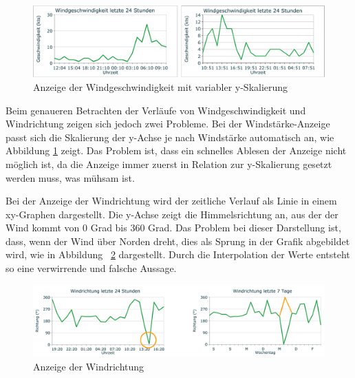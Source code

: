 \begin{figure}[h!]
	\centering
	\includegraphics[width=1\linewidth]{img/wind-geschw}
	\caption{Anzeige der Windgeschwindigkeit mit variabler y-Skalierung}
	\label{img:wind-geschw}
\end{figure}

\noindent
Beim genaueren Betrachten der Verläufe von Windgeschwindigkeit und Windrichtung zeigen sich jedoch zwei Probleme.
Bei der Windstärke-Anzeige passt sich die Skalierung der y-Achse je nach Windstärke automatisch an, wie Abbildung \ref{img:wind-geschw} zeigt. Das Problem ist, dass ein schnelles Ablesen der Anzeige nicht möglich ist, da die Anzeige immer zuerst in Relation zur y-Skalierung gesetzt werden muss, was mühsam ist.
\newline



\noindent
Bei der Anzeige der Windrichtung wird der zeitliche Verlauf als Linie in einem xy-Graphen dargestellt. Die y-Achse zeigt die Himmelsrichtung an, aus der der Wind kommt von 0 Grad bis 360 Grad. Das Problem bei dieser Darstellung ist, dass, wenn der Wind über Norden dreht, dies als Sprung in der Grafik abgebildet wird, wie in Abbildung~ \ref{img:wind-richtung} dargestellt. Durch die Interpolation der Werte entsteht so eine verwirrende und falsche Aussage.
\newline

\begin{figure}[h!]
	\centering
	\includegraphics[width=1\linewidth]{img/wind-richtung}
	\caption{Anzeige der Windrichtung}
	\label{img:wind-richtung}
\end{figure}

